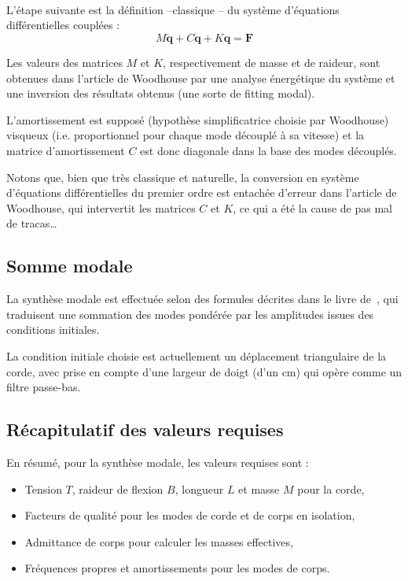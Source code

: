 \documentclass[a4paper,10pt]{article}
\begin{document}
  \paragraph*{}
  L'étape suivante est la définition --classique -- du système d'équations
différentielles cou\-plées :
\[ M \ddot{\bm{q}} + C \dot{\bm{q}} + K \bm{q} = \bm{F} \]

  Les valeurs des matrices \( M \) et \( K \), respectivement de masse et de
raideur, sont obtenues dans l'article de Woodhouse par une analyse énergétique
du système et une inversion des résultats obtenus (une sorte de fitting modal).

  L'amortissement est supposé (hypothèse simplificatrice choisie par Woodhouse)
visqueux (i.e. proportionnel pour chaque mode découplé à sa vitesse) et la
matrice d'amortissement \( C \) est donc diagonale dans la base des
modes découplés.

Notons que, bien que très classique et naturelle, la conversion en système
d'équations différentielles du premier ordre est entachée d'erreur dans
l'article de Woodhouse, qui intervertit les matrices \( C \) et \( K \), ce
qui a été la cause de pas mal de tracas\dots

\subsection{Somme modale}

  La synthèse modale est effectuée selon des formules décrites
dans le livre de~\textcite{newland}, qui traduisent une sommation des modes
pondérée par les amplitudes issues des conditions initiales.

  La condition initiale choisie est actuellement un déplacement triangulaire
de la corde, avec prise en compte d'une largeur de doigt (d'un \( \si{\cm} \))
qui opère comme un filtre passe-bas.

\subsection{Récapitulatif des valeurs requises}

En résumé, pour la synthèse modale, les valeurs requises sont :
\begin{itemize}
 \item Tension \( T \), raideur de flexion \( B \), longueur \( L \) et
  masse \( M \) pour la corde,
 \item Facteurs de qualité pour les modes de corde et de corps en isolation,
 \item Admittance de corps pour calculer les masses effectives,
 \item Fréquences propres et amortissements pour les modes de corps.
\end{itemize}

\subsection{}

  
\end{document}
